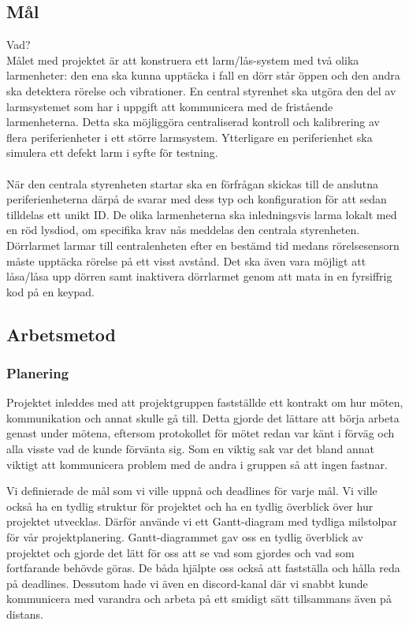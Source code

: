 \documentclass{article}
\begin{document}
\subsection{Mål}
Vad?
\\
Målet med projektet är att konstruera ett larm/lås-system med två olika larmenheter: 
den ena ska kunna upptäcka i fall en dörr står öppen och den andra ska detektera rörelse och vibrationer. 
En central styrenhet ska utgöra den del av larmsystemet som har i uppgift att kommunicera med de fristående larmenheterna. 
Detta ska möjliggöra centraliserad kontroll och kalibrering av flera periferienheter i ett större larmsystem. 
Ytterligare en periferienhet ska simulera ett defekt larm i syfte för testning.
\\\\
När den centrala styrenheten startar ska en förfrågan skickas till de anslutna periferienheterna därpå de svarar med dess typ och konfiguration för att sedan tilldelas ett unikt ID. De olika larmenheterna ska inledningsvis larma lokalt med en röd lysdiod, om specifika krav nås meddelas den centrala styrenheten. Dörrlarmet larmar till centralenheten efter en bestämd tid medans rörelsesensorn måste upptäcka rörelse på ett visst avstånd. Det ska även vara möjligt att låsa/låsa upp dörren samt inaktivera dörrlarmet genom att mata in en fyrsiffrig kod på en keypad.


\subsection{Arbetsmetod}

\subsubsection{Planering}
Projektet inleddes med att projektgruppen fastställde ett kontrakt om hur möten, kommunikation och annat skulle gå till. Detta gjorde det lättare att börja arbeta genast under mötena, eftersom protokollet för mötet redan var känt i förväg och alla visste vad de kunde förvänta sig. Som en viktig sak var det bland annat viktigt att kommunicera problem med de andra i gruppen så att ingen fastnar.

Vi definierade de mål som vi ville uppnå och deadlines för varje mål. Vi ville också ha en tydlig struktur för projektet och ha en tydlig överblick över hur projektet utvecklas. Därför använde vi ett Gantt-diagram med tydliga milstolpar för vår projektplanering. Gantt-diagrammet gav oss en tydlig överblick av projektet och gjorde det lätt för oss att se vad som gjordes och vad som fortfarande behövde göras. De båda hjälpte oss också att fastställa och hålla reda på deadlines. Dessutom hade vi även en discord-kanal där vi snabbt kunde kommunicera med varandra och arbeta på ett smidigt sätt tillsammans även på distans.
\end{document}
